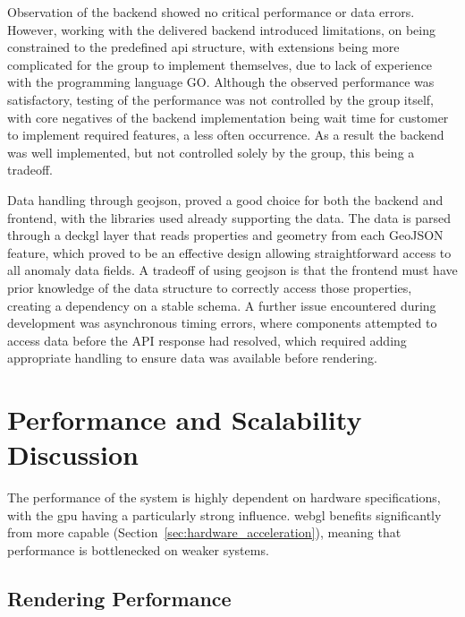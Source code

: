 Observation of the backend showed no critical performance or data errors. However, working with the delivered backend introduced limitations, on being constrained to the predefined \acrshort{api} structure, with extensions being more complicated for the group to implement themselves, due to lack of experience with the programming language GO. Although the observed performance was satisfactory, testing of the performance was not controlled by the group itself, with core negatives of the backend implementation being wait time for customer to implement required features, a less often occurrence. As a result the backend was well implemented, but not controlled solely by the group, this being a tradeoff.

Data handling through \acrshort{geojson}, proved a good choice for both the backend and frontend, with the libraries used already supporting the data. The data is parsed through a \gls{deckgl} layer that reads properties and geometry from each GeoJSON feature, which proved to be an effective design allowing straightforward access to all anomaly data fields. A tradeoff of using \acrshort{geojson} is that the frontend must have prior knowledge of the data structure to correctly access those properties, creating a dependency on a stable schema. A further issue encountered during development was asynchronous timing errors, where components attempted to access data before the API response had resolved, which required adding appropriate handling to ensure data was available before rendering. 
  

\section{Performance and Scalability Discussion}

The performance of the system is highly dependent on hardware specifications, with the \acrshort{gpu} having a particularly strong influence. \acrshort{webgl} benefits significantly from more capable  (Section~\ref{sec:hardware_acceleration}), meaning that performance is bottlenecked on weaker systems. 


\subsection{Rendering Performance}

